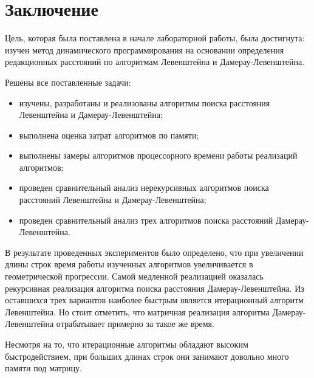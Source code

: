 \chapter*{Заключение}

Цель, которая была поставлена в начале лабораторной работы, была достигнута: изучен метод динамического программирования на основании определения редакционных расстояний по алгоритмам Левенштейна и Дамерау-Левенштейна.

Решены все поставленные задачи:

\begin{itemize}
	\item изучены, разработаны и реализованы алгоритмы поиска расстояния Левенштейна и Дамерау-Левенштейна;
	\item выполнена оценка затрат алгоритмов по памяти;
    \item выполнены замеры алгоритмов процессорного времени работы реализаций алгоритмов;
	\item проведен сравнительный анализ нерекурсивных алгоритмов поиска расстояний Левенштейна и Дамерау-Левенштейна;
	\item проведен сравнительный анализ трех алгоритмов поиска расстояний Дамерау-Левенштейна.
\end{itemize}

В результате проведенных экспериментов было определено, что при увеличении длины строк время работы изученных алгоритмов увеличивается в геометрической прогрессии. Самой медленной реализацией оказалась рекурсивная реализация алгоритма поиска расстояния Дамерау-Левенштейна. Из оставшихся трех вариантов наиболее быстрым является итерационный алгоритм Левенштейна. Но стоит отметить, что матричная реализация алгоритма Дамерау-Левенштейна отрабатывает примерно за такое же время. 

Несмотря на то, что итерационные алгоритмы обладают высоким быстродействием, при больших длинах строк они занимают довольно много памяти под матрицу.
